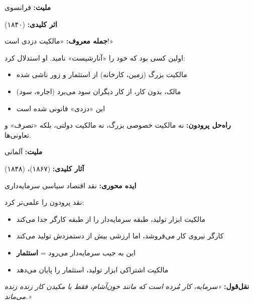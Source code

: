 \begin{personbox}

\textbf{ملیت:} فرانسوی

\textbf{اثر کلیدی:}  (۱۸۴۰)

\textbf{جمله معروف:} «مالکیت دزدی است!»

\mediumspace

 اولین کسی بود که خود را «آنارشیست» نامید. او استدلال کرد:
\begin{itemize}[nosep]
    \item مالکیت بزرگ (زمین، کارخانه) از استثمار و زور ناشی شده
    \item مالک، بدون کار، از کار دیگران سود می‌برد (اجاره، سود)
    \item این «دزدی» قانونی شده است
\end{itemize}

\mediumspace

\textbf{راه‌حل پرودون:} نه مالکیت خصوصی بزرگ، نه مالکیت دولتی، بلکه «تصرف» و تعاونی‌ها.
\end{personbox}

\begin{personbox}

\textbf{ملیت:} آلمانی

\textbf{آثار کلیدی:}  (۱۸۶۷)،  (۱۸۴۸)

\textbf{ایده محوری:} نقد اقتصاد سیاسی سرمایه‌داری

\mediumspace

 نقد پرودون را علمی‌تر کرد:
\begin{itemize}[nosep]
    \item مالکیت ابزار تولید، طبقه سرمایه‌دار را از طبقه کارگر جدا می‌کند
    \item کارگر نیروی کار می‌فروشد، اما ارزشی بیش از دستمزدش تولید می‌کند
    \item این  به جیب سرمایه‌دار می‌رود = \textbf{استثمار}
    \item مالکیت اشتراکی ابزار تولید، استثمار را پایان می‌دهد
\end{itemize}

\mediumspace

\textbf{نقل‌قول:} \textit{«سرمایه، کار مُرده است که مانند خون‌آشام، فقط با مکیدن کار زنده زنده می‌ماند.»}
\end{personbox}

